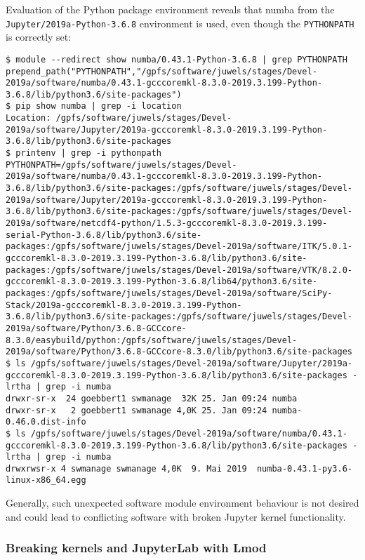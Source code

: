 Evaluation of the Python package environment reveals that numba from the \verb|Jupyter/2019a-Python-3.6.8| environment is used, even though the \verb|PYTHONPATH| is correctly set:
%
\begin{verbatim}
$ module --redirect show numba/0.43.1-Python-3.6.8 | grep PYTHONPATH
prepend_path("PYTHONPATH","/gpfs/software/juwels/stages/Devel-2019a/software/numba/0.43.1-gcccoremkl-8.3.0-2019.3.199-Python-3.6.8/lib/python3.6/site-packages")
$ pip show numba | grep -i location
Location: /gpfs/software/juwels/stages/Devel-2019a/software/Jupyter/2019a-gcccoremkl-8.3.0-2019.3.199-Python-3.6.8/lib/python3.6/site-packages
$ printenv | grep -i pythonpath
PYTHONPATH=/gpfs/software/juwels/stages/Devel-2019a/software/numba/0.43.1-gcccoremkl-8.3.0-2019.3.199-Python-3.6.8/lib/python3.6/site-packages:/gpfs/software/juwels/stages/Devel-2019a/software/Jupyter/2019a-gcccoremkl-8.3.0-2019.3.199-Python-3.6.8/lib/python3.6/site-packages:/gpfs/software/juwels/stages/Devel-2019a/software/netcdf4-python/1.5.3-gcccoremkl-8.3.0-2019.3.199-serial-Python-3.6.8/lib/python3.6/site-packages:/gpfs/software/juwels/stages/Devel-2019a/software/ITK/5.0.1-gcccoremkl-8.3.0-2019.3.199-Python-3.6.8/lib/python3.6/site-packages:/gpfs/software/juwels/stages/Devel-2019a/software/VTK/8.2.0-gcccoremkl-8.3.0-2019.3.199-Python-3.6.8/lib64/python3.6/site-packages:/gpfs/software/juwels/stages/Devel-2019a/software/SciPy-Stack/2019a-gcccoremkl-8.3.0-2019.3.199-Python-3.6.8/lib/python3.6/site-packages:/gpfs/software/juwels/stages/Devel-2019a/software/Python/3.6.8-GCCcore-8.3.0/easybuild/python:/gpfs/software/juwels/stages/Devel-2019a/software/Python/3.6.8-GCCcore-8.3.0/lib/python3.6/site-packages
$ ls /gpfs/software/juwels/stages/Devel-2019a/software/Jupyter/2019a-gcccoremkl-8.3.0-2019.3.199-Python-3.6.8/lib/python3.6/site-packages -lrtha | grep -i numba
drwxr-sr-x  24 goebbert1 swmanage  32K 25. Jan 09:24 numba
drwxr-sr-x   2 goebbert1 swmanage 4,0K 25. Jan 09:24 numba-0.46.0.dist-info
$ ls /gpfs/software/juwels/stages/Devel-2019a/software/numba/0.43.1-gcccoremkl-8.3.0-2019.3.199-Python-3.6.8/lib/python3.6/site-packages -lrtha | grep -i numba
drwxrwsr-x 4 swmanage swmanage 4,0K  9. Mai 2019  numba-0.43.1-py3.6-linux-x86_64.egg
\end{verbatim}

Generally, such unexpected software module environment behaviour is not desired and could lead to conflicting software with broken Jupyter kernel functionality.

\subsubsection{Breaking kernels and JupyterLab with Lmod}

